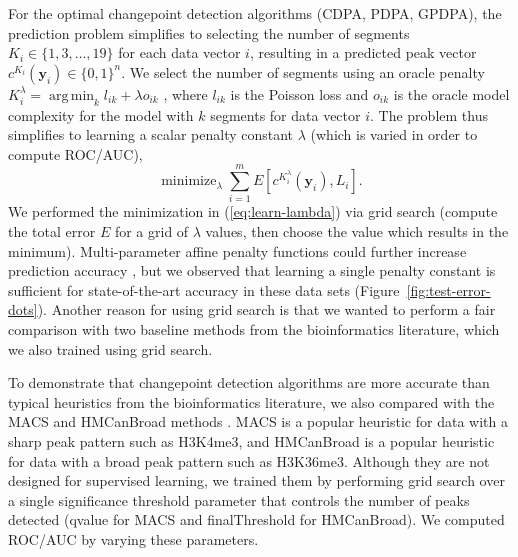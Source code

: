 \documentclass[aoas]{imsart}
\DeclareMathOperator*{\argmin}{arg\,min}
\DeclareMathOperator*{\minimize}{minimize}
\begin{document}
For the optimal changepoint detection algorithms (CDPA, PDPA, GPDPA),
the prediction problem simplifies to selecting the number of segments
$K_i\in \{1, 3,\dots, 19\}$ for each data vector $i$, resulting in a
predicted peak vector $c^{K_i}(\mathbf y_i)\in\{0,1\}^n$. We select
the number of segments using an oracle penalty
$K_i^\lambda=\argmin_k l_{ik} + \lambda o_{ik}$
\citep{cleynen2013segmentation}, where $l_{ik}$ is the Poisson loss
and $o_{ik}$ is the oracle model complexity for the model with $k$
segments for data vector $i$.  The problem thus simplifies to learning
a scalar penalty constant $\lambda$ (which is varied in order to
compute ROC/AUC),
\begin{equation}
  \label{eq:learn-lambda}
  \minimize_{\lambda}
  \sum_{i=1}^m E\left[
    c^{K_i^\lambda}(\mathbf y_i), 
    L_i\right].
\end{equation}
We performed the minimization in
(\ref{eq:learn-lambda}) via grid search (compute the total error $E$
for a grid of $\lambda$ values, then choose the value which results in
the minimum). Multi-parameter affine penalty functions could further
increase prediction accuracy \citep{HOCKING-penalties}, but we
observed that learning a single penalty constant is sufficient for
state-of-the-art accuracy in these data sets
(Figure~\ref{fig:test-error-dots}). Another reason for using grid
search is that we wanted to perform a fair comparison with two
baseline methods from the bioinformatics literature, which we also
trained using grid search.

To demonstrate that changepoint detection algorithms are more accurate
than typical heuristics from the bioinformatics literature, we also
compared with the MACS and HMCanBroad methods \citep{MACS,
  HMCan}. MACS is a popular heuristic for data with a sharp peak
pattern such as H3K4me3, and \mbox{HMCanBroad} is a popular heuristic
for data with a broad peak pattern such as H3K36me3. Although they are
not designed for supervised learning, we trained them by performing
grid search over a single significance threshold parameter that
controls the number of peaks detected (qvalue for MACS and
finalThreshold for HMCanBroad). We computed ROC/AUC by varying these
parameters.
\end{document}
